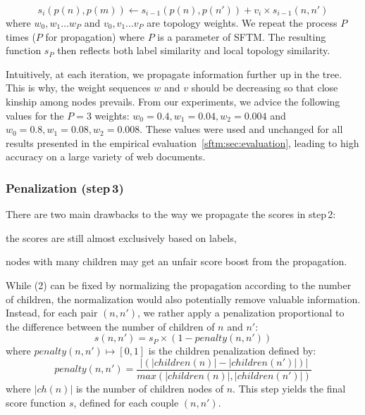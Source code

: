 \begin{equation}\label{eq:score_parent}
	s_{i}(p(n), p(m)) \gets s_{i-1}(p(n), p(n')) +  v_i \times s_{i-1}(n, n')
\end{equation}
where $w_0, w_1\dots w_{P}$ and $v_0, v_1 ... v_P$ are topology weights.
We repeat the process $P$ times ($P$ for propagation) where $P$ is a parameter of SFTM.
The resulting function $s_{P}$ then reflects both label similarity and local topology similarity.

Intuitively, at each iteration, we propagate information further up in the tree.
This is why, the weight sequences $w$ and $v$ should be decreasing so that close kinship among nodes prevails.
From our experiments, we advice the following values for the $P=3$ weights: $w_0 = 0.4, w_1 = 0.04, w_2 = 0.004$ and $w_0 = 0.8, w_1 = 0.08, w_2 = 0.008$.
These values were used and unchanged for all results presented in the empirical evaluation~\ref{sftm:sec:evaluation}, leading to high accuracy on a large variety of web documents.

\subsubsection{Penalization (step\,3)}
There are two main drawbacks to the way we propagate the scores in step\,2:
\begin{inparaenum}
\item the scores are still almost exclusively based on labels,
\item nodes with many children may get an unfair score boost from the propagation.
\end{inparaenum}

While (2) can be fixed by normalizing the propagation according to the number of children, the normalization would also potentially remove valuable information.
Instead, for each pair $(n,n')$, we rather apply a penalization proportional to the difference between the number of children of $n$ and $n'$:
\begin{equation}
s(n,n') = s_{P} \times (1 - penalty(n,n'))
\end{equation}
where $penalty(n,n') \mapsto [0, 1]$ is the children penalization defined by:
\begin{equation}
penalty(n,n') = \frac{|(|children(n)|-|children(n')|)|}{max(|children(n)|,|children(n')|)}
\end{equation}
where $|ch(n)|$ is the number of children nodes of $n$.
This step yields the final score function $s$, defined for each couple $(n,n')$.

